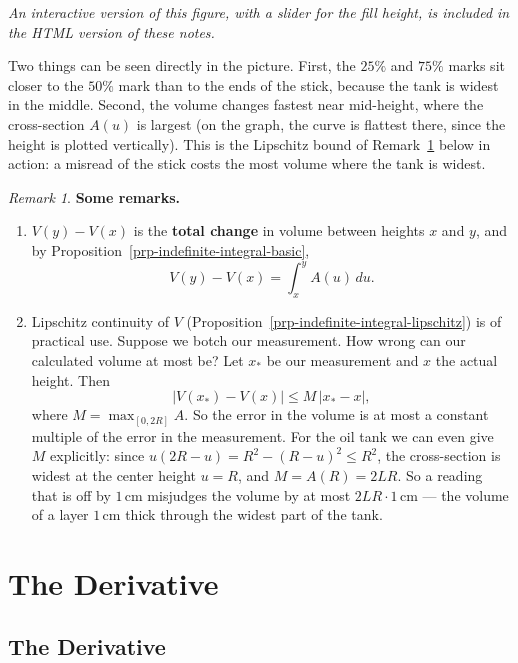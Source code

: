 \documentclass[
  letterpaper,
  DIV=11,
  numbers=noendperiod]{scrreprt}
\providecommand{\tightlist}{%
  \setlength{\itemsep}{0pt}\setlength{\parskip}{0pt}}
\theoremstyle{plain}
\theoremstyle{plain}
\theoremstyle{definition}
\theoremstyle{definition}
\theoremstyle{definition}
\theoremstyle{plain}
\theoremstyle{plain}
\theoremstyle{remark}
\newtheorem{refremark}{Remark}[chapter]
\begin{document}
\emph{An interactive version of this figure, with a slider for the fill
height, is included in the HTML version of these notes.}

Two things can be seen directly in the picture. First, the \(25\%\) and
\(75\%\) marks sit closer to the \(50\%\) mark than to the ends of the
stick, because the tank is widest in the middle. Second, the volume
changes fastest near mid-height, where the cross-section \(A(u)\) is
largest (on the graph, the curve is flattest there, since the height is
plotted vertically). This is the Lipschitz bound of
Remark~\ref{rem-oil-tank-properties} below in action: a misread of the
stick costs the most volume where the tank is widest.

\begin{refremark}
\textbf{Some remarks.}

\begin{enumerate}
\def\labelenumi{\arabic{enumi}.}
\tightlist
\item
  \(V(y) - V(x)\) is the \textbf{total change} in volume between heights
  \(x\) and \(y\), and by
  Proposition~\ref{prp-indefinite-integral-basic}, \[
  V(y) - V(x) = \int_x^y A(u)\,du .
  \]
\item
  Lipschitz continuity of \(V\)
  (Proposition~\ref{prp-indefinite-integral-lipschitz}) is of practical
  use. Suppose we botch our measurement. How wrong can our calculated
  volume at most be? Let \(x_*\) be our measurement and \(x\) the actual
  height. Then \[
  \lvert V(x_*) - V(x) \rvert \le M\,\lvert x_* - x \rvert,
  \] where \(M = \max_{[0,2R]} A\). So the error in the volume is at
  most a constant multiple of the error in the measurement. For the oil
  tank we can even give \(M\) explicitly: since
  \(u(2R-u) = R^2 - (R-u)^2 \le R^2\), the cross-section is widest at
  the center height \(u=R\), and \(M = A(R) = 2LR\). So a reading that
  is off by \(1\,\text{cm}\) misjudges the volume by at most
  \(2LR\cdot 1\,\text{cm}\) --- the volume of a layer \(1\,\text{cm}\)
  thick through the widest part of the tank.
\end{enumerate}

\label{rem-oil-tank-properties}

\end{refremark}

\part{The Derivative}

\chapter{The Derivative}\label{the-derivative-1}
\end{document}
